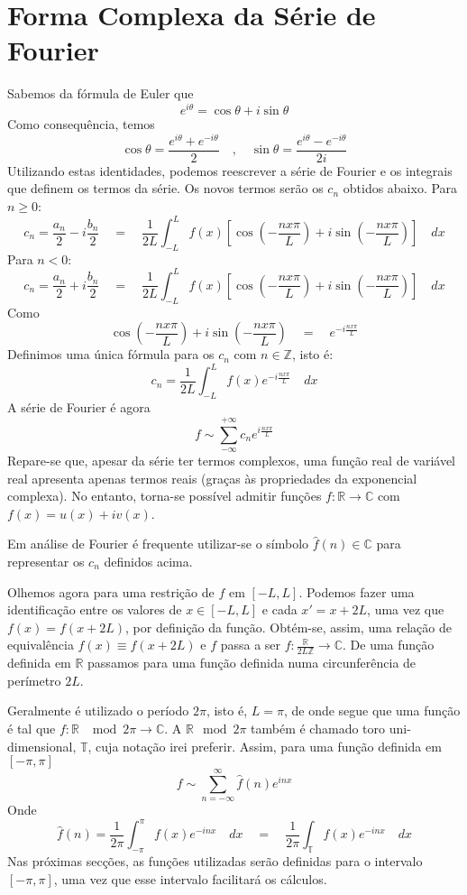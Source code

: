 \documentclass{article}
\begin{document}
\section{Forma Complexa da Série de Fourier}
Sabemos da fórmula de Euler que
\[e^{i\theta}=\cos{\theta}+i\sin{\theta}\]
Como consequência, temos
\[\cos{\theta}=\frac{e^{i\theta}+e^{-i\theta}}{2}\quad{,}\quad \sin{\theta}=\frac{e^{i\theta}-e^{-i\theta}}{2i}\]
Utilizando estas identidades, podemos reescrever a série de Fourier e os integrais que definem os termos da série\cite{djairo}. Os novos termos serão os \(c_n\) obtidos abaixo.
Para \(n\geq0\):
\[c_n=\frac{a_n}{2}-i\frac{b_n}{2}\quad{=}\quad\frac{1}{2L}\displaystyle\int_{-L}^{L}f(x)[\cos{(-\frac{nx\pi}{L})}+i\sin{(-\frac{nx\pi}{L})}]\quad dx\]
Para \(n<0\):
\[c_n=\frac{a_n}{2}+i\frac{b_n}{2}\quad{=}\quad\frac{1}{2L}\displaystyle\int_{-L}^{L}f(x)[\cos{(-\frac{nx\pi}{L})}+i\sin{(-\frac{nx\pi}{L})}]\quad dx\]
Como
\[\cos{(-\frac{nx\pi}{L})}+i\sin{(-\frac{nx\pi}{L})}\quad{=}\quad e^{-i\frac{nx\pi}{L}}\]
Definimos uma única fórmula para os \(c_n\) com \(n\in\mathbb{Z}\), isto é:
\[c_n=\frac{1}{2L}\displaystyle\int_{-L}^{L}f(x)e^{-i\frac{nx\pi}{L}} \quad dx\]
A série de Fourier é agora
\[f\sim \displaystyle\sum_{-\infty}^{+\infty} c_ne^{i\frac{nx\pi}{L}}\]
Repare-se que, apesar da série ter termos complexos, uma função real de variável real apresenta apenas termos reais (graças às propriedades da exponencial complexa).
No entanto, torna-se possível admitir funções \(f:\mathbb{R}\rightarrow\mathbb{C}\) com \(f(x)= u(x)+iv(x)\).

Em análise de Fourier é frequente utilizar-se o símbolo \(\hat{f}(n)\in\mathbb{C}\) para representar os \(c_n\) definidos acima.

Olhemos agora para uma restrição de \(f\) em \([-L,L]\). Podemos fazer uma identificação entre os valores de \(x\in[-L,L]\) e cada \(x'=x+2L\), uma vez que \(f(x)=f(x+2L)\), por definição da função. Obtém-se, assim, uma relação de equivalência \(f(x)\equiv f(x+2L)\) e \(f\) passa a ser \(f:\frac{\mathbb{R}}{2L\mathbb{Z}}\rightarrow\mathbb{C}\). De uma função definida em \(\mathbb{R}\) passamos para uma função definida numa circunferência de perímetro \(2L\).

Geralmente é utilizado o período \(2\pi\), isto é, \(L=\pi\), de onde segue que uma função é tal que \(f: \mathbb{R}\) \(\mod{2\pi}\)\( \rightarrow \mathbb{C}\).  A \(\mathbb{R}\)\(\mod{2\pi}\) também é chamado toro uni-dimensional, \(\mathbb{T}\), cuja notação irei preferir.
Assim, para uma função definida em \([-\pi,\pi]\)
\[f\sim \displaystyle\sum_{n=-\infty}^{\infty}\hat{f}(n)e^{inx}\]
Onde 
\[\hat{f}(n)=\frac{1}{2\pi}\displaystyle\int_{-\pi}^{\pi}f(x)e^{-inx}\quad dx \quad{=}\quad \frac{1}{2\pi}\displaystyle\int_{\mathbb{T}}f(x)e^{-inx}\quad dx\]
Nas próximas secções, as funções utilizadas serão definidas para o intervalo \([-\pi,\pi]\), uma vez que esse intervalo facilitará os cálculos. 
\end{document}
